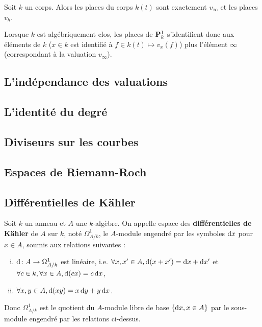 	\begin{pop}
		Soit $k$ un corps.
		Alors les places du corps $k(t)$ sont exactement $v_\infty$ et les places $v_h$.
	\end{pop}
	
	\begin{rem}
		Lorsque $k$ est algébriquement clos, les places de $\mathbf{P}_k^1$ s'identifient donc aux éléments de $k$ ($x \in k$ est identifié à $f \in k(t) \mapsto v_x(f)$) plus l'élément $\infty$ (correspondant à la valuation $v_\infty$).
	\end{rem}

\subsection{L'indépendance des valuations}

	


\subsection{L'identité du degré}

	


\subsection{Diviseurs sur les courbes}

	


\subsection{Espaces de Riemann-Roch}

	


\subsection{Différentielles de Kähler}

	\begin{defn}
		Soit $k$ un anneau et $A$ une $k$-algèbre.
		On appelle espace des \textbf{différentielles de Kähler} de $A$ sur $k$, noté $\Omega^1_{A/k}$, le $A$-module engendré par les symboles $\mathop{}\mathopen{}\mathrm{d} x$ pour $x \in A$, soumis aux relations suivantes :
		\begin{enumerate}[(i)]
			\item $\mathop{}\mathopen{}\mathrm{d} \colon A \to \Omega^1_{A/k}$ est linéaire, i.e. $\forall x, x' \in A, \mathop{}\mathopen{}\mathrm{d}(x + x') = \mathop{}\mathopen{}\mathrm{d} x + \mathop{}\mathopen{}\mathrm{d} x'$ et $\forall c \in k, \forall x \in A, \mathop{}\mathopen{}\mathrm{d}(cx) = c \mathop{}\mathopen{}\mathrm{d} x$,
			\item $\forall x, y \in A, \mathop{}\mathopen{}\mathrm{d}(xy) = x \mathop{}\mathopen{}\mathrm{d} y + y \mathop{}\mathopen{}\mathrm{d} x$.
		\end{enumerate}
		Donc $\Omega^1_{A/k}$ est le quotient du $A$-module libre de base $\{ \mathop{}\mathopen{}\mathrm{d} x, x \in A \}$ par le sous-module engendré par les relations ci-dessus.
	\end{defn}
	
